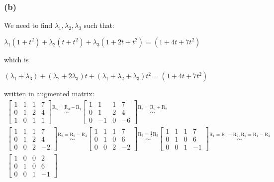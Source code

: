 \documentclass[12pt]{article}
\begin{document}
\subsubsection*{(b)}
  We need to find $\lambda_1, \lambda_2, \lambda_3$ such that:
  \begin{center}
    $\lambda_1 (1 + t^2)+\lambda_2(t + t^2)+\lambda_3(1+2t+t^2)=(1+4t+7t^2)$
  \end{center}
  which is
  \begin{center}
    $(\lambda_1 + \lambda_3) + (\lambda_2 + 2\lambda_3)t + (\lambda_1+\lambda_2+\lambda_3)t^2=(1+4t+7t^2)$
  \end{center}
  written in augmented matrix:
  \[
  \begin{array}{c}
  \left[\begin{array}{ccc|c}
  1 & 1 & 1 & 7 \\
  0 & 1 & 2 & 4 \\
  1 & 0 & 1 & 1
  \end{array}\right]
  \overset{\text{R}_3 = \text{R}_3 - \text{R}_1}{\sim}
  \left[\begin{array}{ccc|c}
  1 & 1 & 1 & 7 \\
  0 & 1 & 2 & 4 \\
  0 & -1 & 0 & -6
  \end{array}\right]
  \overset{\text{R}_3 = \text{R}_3 + \text{R}_2}{\sim} \\
  \left[\begin{array}{ccc|c}
  1 & 1 & 1 & 7 \\
  0 & 1 & 2 & 4 \\
  0 & 0 & 2 & -2
  \end{array}\right]
  \overset{\text{R}_2 = \text{R}_2 - \text{R}_3}{\sim}
  \left[\begin{array}{ccc|c}
  1 & 1 & 1 & 7 \\
  0 & 1 & 0 & 6 \\
  0 & 0 & 2 & -2
  \end{array}\right]
  \overset{\text{R}_3 = \frac{1}{2} \text{R}_3}{\sim}
  \left[\begin{array}{ccc|c}
  1 & 1 & 1 & 7 \\
  0 & 1 & 0 & 6 \\
  0 & 0 & 1 & -1
  \end{array}\right]
  \overset{\text{R}_1 = \text{R}_1 - \text{R}_2,\text{R}_1 = \text{R}_1 - \text{R}_3}{\sim} \\
  \left[\begin{array}{ccc|c}
  1 & 0 & 0 & 2 \\
  0 & 1 & 0 & 6 \\
  0 & 0 & 1 & -1
  \end{array}\right]
  \end{array}
  \]
\end{document}
